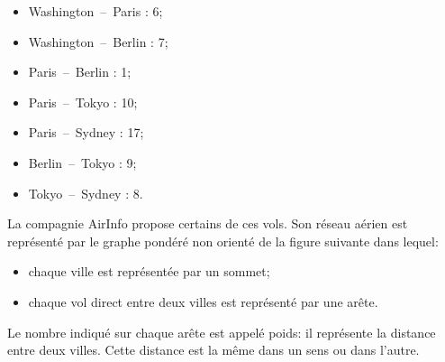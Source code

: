 \begin{minipage}{0.35\linewidth}
    \begin{itemize}
    \item Washington~--~Paris : 6;
    \item Washington~--~Berlin : 7;
    \item Paris~--~Berlin : 1;
    \item Paris~--~Tokyo : 10;
    \item Paris~--~Sydney : 17;
    \item Berlin~--~Tokyo : 9;
    \item Tokyo~--~Sydney : 8.
\end{itemize}
\end{minipage}
\hfill
\begin{minipage}{0.6\linewidth}
    \centering
\label{exemplesresolutions4}

\end{minipage}

\medskip

La compagnie AirInfo propose certains de ces vols. Son réseau aérien est représenté par le graphe pondéré non orienté de la figure suivante dans lequel:
\begin{itemize}
    \item chaque ville est représentée par un sommet;
    \item chaque vol direct entre deux villes est représenté par une arête.
\end{itemize}
Le nombre indiqué sur chaque arête est appelé poids: il représente la distance entre deux villes. Cette distance est la même dans un sens ou dans l'autre.

